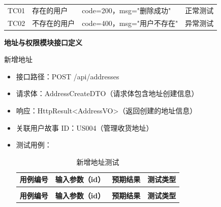 \begin{levellist}
\begin{levellist}
\begin{itemize}
\begin{longtable}{>{\centering\arraybackslash}m{1.7cm} >{\centering\arraybackslash}m{3.3cm} >{\centering\arraybackslash}m{6cm} >{\centering\arraybackslash}m{2cm}}
                      \bottomrule
                      \endfoot

                      TC01          & 存在的用户             & code=200，msg="删除成功"  & 正常测试          \\
                      TC02          & 不存在的用户            & code=400，msg="用户不存在" & 异常测试          \\
                  \end{longtable}
        \end{itemize}

    \end{levellist}

    \item \textbf{地址与权限模块接口定义}
    \begin{levellist}
        \item 新增地址
        \begin{itemize}
            \item 接口路径：POST /api/addresses
            \item 请求体：AddressCreateDTO（请求体包含地址创建信息）
            \item 响应：HttpResult<AddressVO>（返回创建的地址信息）
            \item 关联用户故事 ID：US004（管理收货地址）
            \item 测试用例：
                  \begin{longtable}{>{\centering\arraybackslash}m{1.7cm} >{\centering\arraybackslash}m{6cm} >{\centering\arraybackslash}m{3.5cm} >{\centering\arraybackslash}m{1.8cm}}

                      \caption{新增地址测试} \label{tab:training}                                                                             \\

                      \toprule
                      \textbf{用例编号} & \textbf{输入参数（id）}                                        & \textbf{预期结果}          & \textbf{测试类型} \\
                      \midrule
                      \endfirsthead

                      \multicolumn{4}{c}{{\tablename\ \thetable{} 续表}}                                                                  \\
                      \toprule
                      \textbf{用例编号} & \textbf{输入参数（id）}                                        & \textbf{预期结果}          & \textbf{测试类型} \\
                      \midrule
                      \endhead


\end{longtable}
\end{itemize}
\end{levellist}
\end{levellist}
